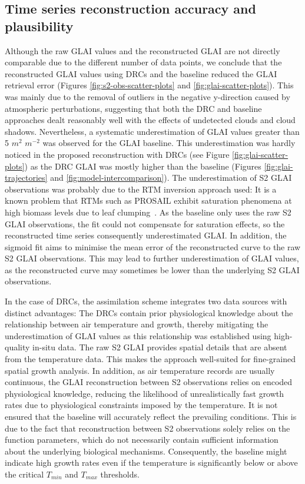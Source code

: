 \subsection{Time series reconstruction accuracy and plausibility}
Although the raw \gls{GLAI} values and the reconstructed \gls{GLAI} are not directly comparable due to the different number of data points, we conclude that the reconstructed \gls{GLAI} values using \gls{DRC}s and the baseline reduced the \gls{GLAI} retrieval error (Figures \ref{fig:s2-obs-scatter-plots} and \ref{fig:glai-scatter-plots}). This was mainly due to the removal of outliers in the negative y-direction caused by atmospheric perturbations, suggesting that both the \gls{DRC} and baseline approaches dealt reasonably well with the effects of undetected clouds and cloud shadows. Nevertheless, a systematic underestimation of GLAI values greater than 5 $m^2$ $m^{-2}$ was observed for the \gls{GLAI} baseline. This underestimation was hardly noticed in the proposed reconstruction with \gls{DRC}s (see Figure \ref{fig:glai-scatter-plots}) as the \gls{DRC} \gls{GLAI} was mostly higher than the baseline (Figures \ref{fig:glai-trajectories} and \ref{fig:model-intercomparison}). The underestimation of \gls{S2} \gls{GLAI} observations was probably due to the \gls{RTM} inversion approach used: It is a known problem that \gls{RTM}s such as PROSAIL exhibit saturation phenomena at high biomass levels due to leaf clumping~\citep{richter_evaluation_2011}. As the baseline only uses the raw \gls{S2} \gls{GLAI} observations, the fit could not compensate for saturation effects, so the reconstructed time series consequently underestimated \gls{GLAI}. In addition, the sigmoid fit aims to minimise the mean error of the reconstructed curve to the raw \gls{S2} \gls{GLAI} observations. This may lead to further underestimation of \gls{GLAI} values, as the reconstructed curve may sometimes be lower than the underlying \gls{S2} \gls{GLAI} observations.

In the case of \gls{DRC}s, the assimilation scheme integrates two data sources with distinct advantages: The \gls{DRC}s contain prior physiological knowledge about the relationship between air temperature and growth, thereby mitigating the underestimation of \gls{GLAI} values as this relationship was established using high-quality in-situ data. The raw \gls{S2} \gls{GLAI} provides spatial details that are absent from the temperature data. This makes the approach well-suited for fine-grained spatial growth analysis. In addition, as air temperature records are usually continuous, the \gls{GLAI} reconstruction between \gls{S2} observations relies on encoded physiological knowledge, reducing the likelihood of unrealistically fast growth rates due to physiological constraints imposed by the temperature. It is not ensured that the baseline will accurately reflect the prevailing conditions. This is due to the fact that reconstruction between \gls{S2} observations solely relies on the function parameters, which do not necessarily contain sufficient information about the underlying biological mechanisms. Consequently, the baseline might indicate high growth rates even if the temperature is significantly below or above the critical $T_{min}$ and $T_{max}$ thresholds.

